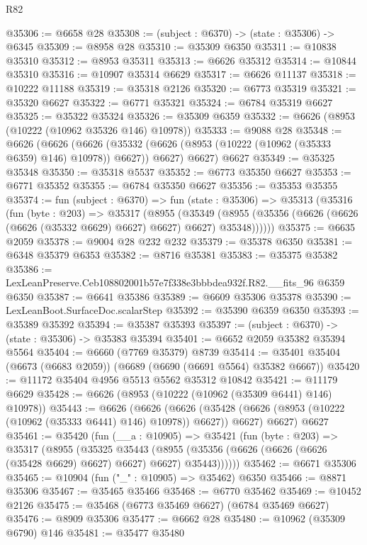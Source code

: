\begin{lexlean}{R82}
\begin{coremodule}
@35306 := @6658 @28
@35308 := (subject : @6370) -> (state : @35306) -> @6345
@35309 := @8958 @28
@35310 := @35309 @6350
@35311 := @10838 @35310
@35312 := @8953 @35311
@35313 := @6626 @35312
@35314 := @10844 @35310
@35316 := @10907 @35314 @6629
@35317 := @6626 @11137
@35318 := @10222 @11188
@35319 := @35318 @2126
@35320 := @6773 @35319
@35321 := @35320 @6627
@35322 := @6771 @35321
@35324 := @6784 @35319 @6627
@35325 := @35322 @35324
@35326 := @35309 @6359
@35332 := @6626 (@8953 (@10222 (@10962 @35326 @146) @10978))
@35333 := @9088 @28
@35348 := @6626
    (@6626
      (@6626 (@35332 (@6626 (@8953 (@10222 (@10962 (@35333 @6359) @146) @10978)) @6627)) @6627)
      @6627)
    @6627
@35349 := @35325 @35348
@35350 := @35318 @5537
@35352 := @6773 @35350 @6627
@35353 := @6771 @35352
@35355 := @6784 @35350 @6627
@35356 := @35353 @35355
@35374 := fun (subject : @6370) =>
  fun (state : @35306) =>
  @35313
    (@35316
      (fun (byte : @203) =>
      @35317
        (@8955
          (@35349
            (@8955 (@35356 (@6626 (@6626 (@6626 (@35332 @6629) @6627) @6627) @6627) @35348))))))
@35375 := @6635 @2059
@35378 := @9004 @28 @232 @232
@35379 := @35378 @6350
@35381 := @6348 @35379 @6353
@35382 := @8716 @35381
@35383 := @35375 @35382
@35386 := LexLeanPreserve.Ceb108802001b57e7f338e3bbbdea932f.R82.__fits_96 @6359 @6350
@35387 := @6641 @35386
@35389 := @6609 @35306 @35378
@35390 := LexLeanBoot.SurfaceDoc.scalarStep
@35392 := @35390 @6359 @6350
@35393 := @35389 @35392
@35394 := @35387 @35393
@35397 := (subject : @6370) -> (state : @35306) -> @35383 @35394
@35401 := @6652 @2059 @35382 @35394 @5564
@35404 := @6660 (@7769 @35379) @8739
@35414 := @35401 @35404 (@6673 (@6683 @2059)) (@6689 (@6690 (@6691 @5564) @35382 @6667))
@35420 := @11172 @35404 @4956 @5513 @5562 @35312 @10842
@35421 := @11179 @6629
@35428 := @6626 (@8953 (@10222 (@10962 (@35309 @6441) @146) @10978))
@35443 := @6626
    (@6626
      (@6626 (@35428 (@6626 (@8953 (@10222 (@10962 (@35333 @6441) @146) @10978)) @6627)) @6627)
      @6627)
    @6627
@35461 := @35420
    (fun (__a : @10905) =>
    @35421
      (fun (byte : @203) =>
      @35317
        (@8955
          (@35325
            @35443
            (@8955 (@35356 (@6626 (@6626 (@6626 (@35428 @6629) @6627) @6627) @6627) @35443))))))
@35462 := @6671 @35306
@35465 := @10904 (fun ("_" : @10905) => @35462) @6350
@35466 := @8871 @35306
@35467 := @35465 @35466
@35468 := @6770 @35462
@35469 := @10452 @2126
@35475 := @35468 (@6773 @35469 @6627) (@6784 @35469 @6627)
@35476 := @8909 @35306
@35477 := @6662 @28
@35480 := @10962 (@35309 @6790) @146
@35481 := @35477 @35480

\end{coremodule}
\end{lexlean}
